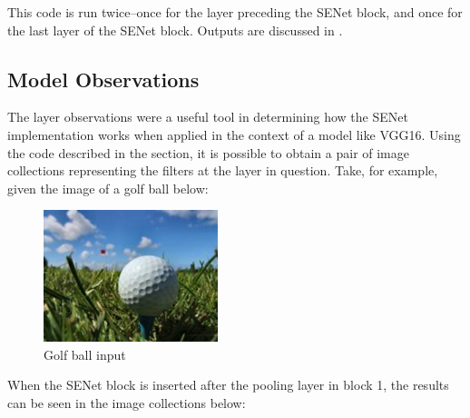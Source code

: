 \documentclass{article}
\begin{document}
\par This code is run twice--once for the layer preceding the SENet block, and once for the last layer of the SENet block. Outputs are discussed in .

\subsection{Model Observations} \label{model_obvs}
\par The layer observations were a useful tool in determining how the SENet implementation works when applied in the context of a model like VGG16.
Using the code described in the  section, it is possible to obtain a pair of image collections representing the filters at the layer in question. Take, for example, given the image of a golf ball below:

\begin{figure}[H]
    \centering
    \includegraphics[width=2in]{csci-8110/hw-3/images/golf.JPEG}
    \caption{Golf ball input}
    \label{fig:gas_input}
\end{figure}

\par When the SENet block is inserted after the pooling layer in block 1, the results can be seen in the image collections below:
\end{document}
